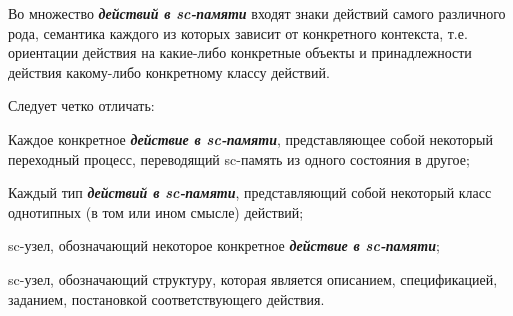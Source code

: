 \begin{SCn}
{Во множество \textbf{\textit{действий в sc-памяти}} входят знаки действий самого различного рода, семантика каждого из которых зависит от конкретного контекста, т.е. ориентации действия на какие-либо конкретные объекты и принадлежности действия какому-либо конкретному классу действий.

Следует четко отличать:
\begin{scnitemize}
\item Каждое конкретное \textbf{\textit{действие в sc-памяти}}, представляющее собой некоторый переходный процесс, переводящий sc-память из одного состояния в другое;
\item Каждый тип \textbf{\textit{действий в sc-памяти}}, представляющий собой некоторый класс однотипных (в том или ином смысле) действий;
\item sc-узел, обозначающий некоторое конкретное \textbf{\textit{действие в sc-памяти}};
\item sc-узел, обозначающий структуру, которая является описанием, спецификацией, заданием, постановкой соответствующего действия.
\end{scnitemize}
}


\end{SCn}
